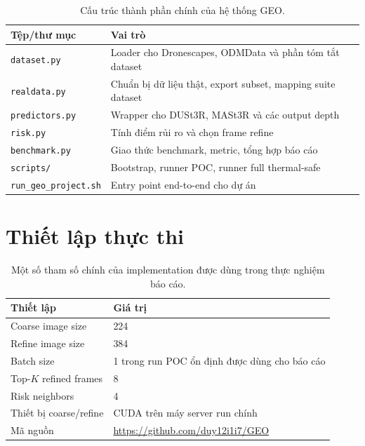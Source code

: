 \documentclass[12pt,a4paper,oneside]{report}
\begin{document}
\begin{table}[t]
\centering
\small
\begin{tabularx}{\textwidth}{>{\raggedright\arraybackslash}p{4cm} X}
\toprule
\textbf{Tệp/thư mục} & \textbf{Vai trò} \\
\midrule
\texttt{dataset.py} & Loader cho Dronescapes, ODMData và phần tóm tắt dataset \\
\texttt{realdata.py} & Chuẩn bị dữ liệu thật, export subset, mapping suite dataset \\
\texttt{predictors.py} & Wrapper cho DUSt3R, MASt3R và các output depth \\
\texttt{risk.py} & Tính điểm rủi ro và chọn frame refine \\
\texttt{benchmark.py} & Giao thức benchmark, metric, tổng hợp báo cáo \\
\texttt{scripts/} & Bootstrap, runner POC, runner full thermal-safe \\
\texttt{run\_geo\_project.sh} & Entry point end-to-end cho dự án \\
\bottomrule
\end{tabularx}
\caption{Cấu trúc thành phần chính của hệ thống GEO.}
\label{tab:repo-structure}
\end{table}

\section{Thiết lập thực thi}

\begin{table}[t]
\centering
\small
\begin{tabular}{lp{8.3cm}}
\toprule
Thiết lập & Giá trị \\
\midrule
Coarse image size & 224 \\
Refine image size & 384 \\
Batch size & 1 trong run POC ổn định được dùng cho báo cáo \\
Top-$K$ refined frames & 8 \\
Risk neighbors & 4 \\
Thiết bị coarse/refine & CUDA trên máy server run chính \\
Mã nguồn & \url{https://github.com/duy12i1i7/GEO} \\
\bottomrule
\end{tabular}
\caption{Một số tham số chính của implementation được dùng trong thực nghiệm báo cáo.}
\label{tab:implementation-thesis}
\end{table}
\end{document}

